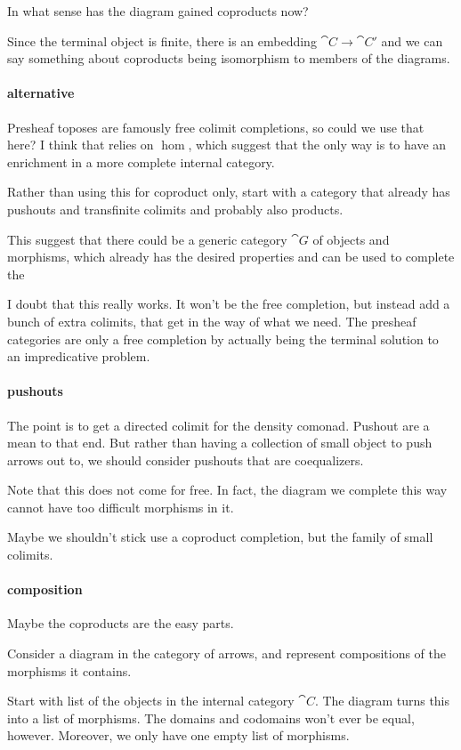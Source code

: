 \documentclass[csh.tex]{subfiles}
\begin{document}
In what sense has the diagram gained coproducts now?

Since the terminal object is finite, there is an embedding $\cat C\to \cat C'$ and we can say something about coproducts being isomorphism to members of the diagrams.

\paragraph{alternative}
Presheaf toposes are famously free colimit completions, so could we use that here? I think that relies on $\hom$, which suggest that the only way is to have an enrichment in a more complete internal category.

Rather than using this for coproduct only, start with a category that already has pushouts and transfinite colimits and probably also products.

This suggest that there could be a generic category $\cat G$ of objects and morphisms, which already has the desired properties and can be used to complete the 

I doubt that this really works. It won't be the free completion, but instead add a bunch of extra colimits, that get in the way of what we need. The presheaf categories are only a free completion by actually being the terminal solution to an impredicative problem.

\paragraph{pushouts}
The point is to get a directed colimit for the density comonad. Pushout are a mean to that end. But rather than having a collection of small object to push arrows out to, we should consider pushouts that are coequalizers.

Note that this does not come for free. In fact, the diagram we complete this way cannot have too difficult morphisms in it.

Maybe we shouldn't stick use a coproduct completion, but the family of small colimits.

\paragraph{composition}
Maybe the coproducts are the easy parts.

Consider a diagram in the category of arrows, and represent compositions of the morphisms it contains.

Start with list of the objects in the internal category $\cat C$. The diagram turns this into a list of morphisms. The domains and codomains won't ever be equal, however. Moreover, we only have one empty list of morphisms.
\end{document}
